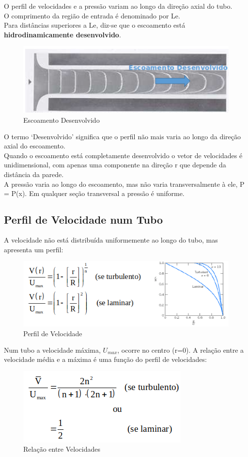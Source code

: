 \documentclass[a4paper, 12pt]{article}
\begin{document}
	O perfil de velocidades e a pressão variam ao longo da direção axial do tubo.\\
	O comprimento da região de entrada é denominado por Le.\\
	Para distâncias superiores a Le, diz-se que o escoamento está \textbf{hidrodinamicamente desenvolvido}.
	\begin{figure}[h]
		\centering
		\includegraphics[width=0.7\linewidth]{imagens/des}
		\caption{Escoamento Desenvolvido}
		\label{fig:des}
	\end{figure}
	O termo ‘Desenvolvido’  significa que o perfil não mais varia ao longo da direção axial do escoamento.\\
	
	Quando o escoamento está completamente desenvolvido o vetor de velocidades é unidimensional, com apenas uma componente na direção r que depende da distância da parede.\\
	
	A pressão varia ao longo do escoamento, mas não varia transversalmente à ele, P = P(x). 
	Em qualquer seção transversal a pressão é uniforme.

\subsection{Perfil de Velocidade num Tubo}
	A velocidade não está distribuída uniformemente ao longo do tubo, mas apresenta um perfil:
	\begin{figure}[h]
		\centering
		\includegraphics[width=0.7\linewidth]{imagens/vel}
		\caption{Perfil de Velocidade}
		\label{fig:vel}
	\end{figure}
	
	Num tubo a velocidade máxima, $U_{max}$, ocorre no centro (r=0). A relação entre a velocidade média e a máxima é uma função do perfil de velocidades:
	\begin{figure}[h]
		\centering
		\includegraphics[width=0.6\linewidth]{imagens/vel1}
		\caption{Relação entre Velocidades}
		\label{fig:vel1}
	\end{figure}
	
\end{document}
